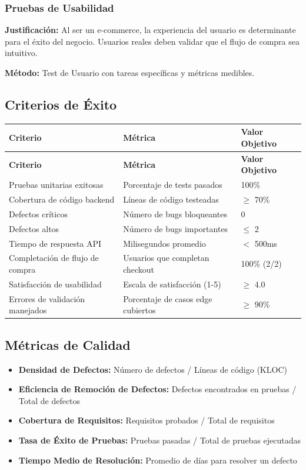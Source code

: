 \documentclass[12pt,a4paper]{article}
\begin{document}
\subsubsection{Pruebas de Usabilidad}
\textbf{Justificación:} Al ser un e-commerce, la experiencia del usuario es determinante para el éxito del negocio. Usuarios reales deben validar que el flujo de compra sea intuitivo.

\textbf{Método:} Test de Usuario con tareas específicas y métricas medibles.

\subsection{Criterios de Éxito}

\begin{longtable}{|p{6cm}|p{4cm}|p{4cm}|}
\hline
\textbf{Criterio} & \textbf{Métrica} & \textbf{Valor Objetivo} \\
\hline
\endfirsthead
\hline
\textbf{Criterio} & \textbf{Métrica} & \textbf{Valor Objetivo} \\
\hline
\endhead
Pruebas unitarias exitosas & Porcentaje de tests pasados & 100\% \\
\hline
Cobertura de código backend & Líneas de código testeadas & $\geq$ 70\% \\
\hline
Defectos críticos & Número de bugs bloqueantes & 0 \\
\hline
Defectos altos & Número de bugs importantes & $\leq$ 2 \\
\hline
Tiempo de respuesta API & Milisegundos promedio & $<$ 500ms \\
\hline
Completación de flujo de compra & Usuarios que completan checkout & 100\% (2/2) \\
\hline
Satisfacción de usabilidad & Escala de satisfacción (1-5) & $\geq$ 4.0 \\
\hline
Errores de validación manejados & Porcentaje de casos edge cubiertos & $\geq$ 90\% \\
\hline
\end{longtable}

\subsection{Métricas de Calidad}

\begin{itemize}
    \item \textbf{Densidad de Defectos:} Número de defectos / Líneas de código (KLOC)
    \item \textbf{Eficiencia de Remoción de Defectos:} Defectos encontrados en pruebas / Total de defectos
    \item \textbf{Cobertura de Requisitos:} Requisitos probados / Total de requisitos
    \item \textbf{Tasa de Éxito de Pruebas:} Pruebas pasadas / Total de pruebas ejecutadas
    \item \textbf{Tiempo Medio de Resolución:} Promedio de días para resolver un defecto
\end{itemize}
\end{document}
